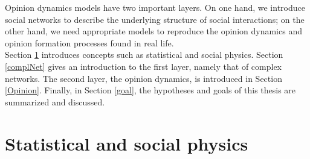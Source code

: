 \documentclass[11 pt , letterpaper , twoside , openright]{book}
\begin{document}
\newline
Opinion dynamics models have two important layers. On one hand, we introduce social networks to describe the underlying structure of social interactions; on the other hand, we need appropriate models to reproduce the opinion dynamics and opinion formation processes found in real life.\\
\newline
Section \ref{statPhys} introduces concepts such as statistical and social physics. Section \ref{complNet} gives an introduction to the first layer, namely that of complex networks. The second layer, the opinion dynamics, is introduced in Section \ref{Opinion}. Finally, in Section \ref{goal}, the hypotheses and goals of this thesis are summarized and discussed.

\section{Statistical and social physics}\label{statPhys}
\end{document}
